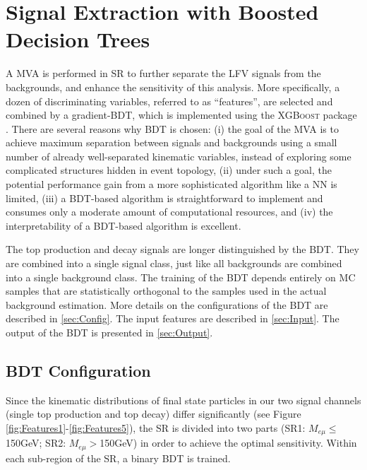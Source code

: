 \chapter{Signal Extraction with Boosted Decision Trees}
\label{chap:BDT}

A \ac{MVA} is performed in \ac{SR} to further separate the LFV signals from the backgrounds, and enhance the sensitivity of this analysis. More specifically, a dozen of discriminating variables, referred to as ``features'', are selected and combined by a gradient-\ac{BDT}, which is implemented using the \textsc{XGBoost} package \cite{Chen:2016:XST:2939672.2939785}. There are several reasons why \ac{BDT} is chosen: (i) the goal of the \ac{MVA} is to achieve maximum separation between signals and backgrounds using a small number of already well-separated kinematic variables, instead of exploring some complicated structures hidden in event topology, (ii) under such a goal, the potential performance gain from a more sophisticated algorithm like a \ac{NN} is limited, (iii) a \ac{BDT}-based algorithm is straightforward to implement and consumes only a moderate amount of computational resources, and (iv) the interpretability of a \ac{BDT}-based algorithm is excellent. 

The top production and decay signals are longer distinguished by the \ac{BDT}. They are combined into a single signal class, just like all backgrounds are combined into a single background class. The training of the \ac{BDT} depends entirely on \ac{MC} samples that are statistically orthogonal to the samples used in the actual background estimation. More details on the configurations of the \ac{BDT} are described in \autoref{sec:Config}. The input features are described in \autoref{sec:Input}. The output of the \ac{BDT} is presented in \autoref{sec:Output}.

\section{BDT Configuration}
\label{sec:Config}

Since the kinematic distributions of final state particles in our two signal channels (single top production and top decay) differ significantly (see Figure \ref{fig:Features1}-\ref{fig:Features5}), the SR is divided into two parts (SR1: $M_{e\mu}\leq$150GeV; SR2: $M_{e\mu}>$150GeV) in order to achieve the optimal sensitivity. Within each sub-region of the SR, a binary BDT is trained.
   
